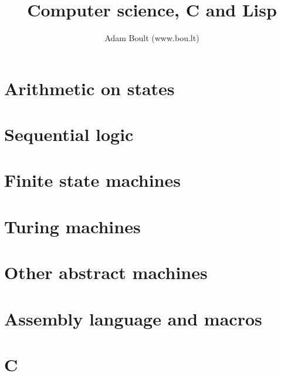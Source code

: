 \documentclass[oneside]{book}
\begin{document}
\author{Adam Boult (www.bou.lt)}
\title{Computer science, C and Lisp}
\maketitle

\setcounter{tocdepth}{0}
\tableofcontents



\part{Arithmetic on states}





\part{Sequential logic}



\part{Finite state machines}



\part{Turing machines}



\part{Other abstract machines}






\part{Assembly language and macros}


\part{C}















\end{document}
